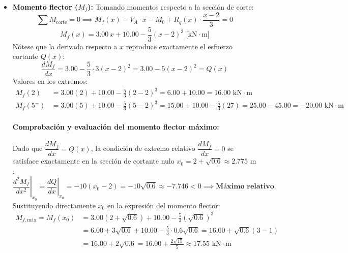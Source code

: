 \begin{itemize}
    \item \textbf{Momento flector ($M_f$):}
          Tomando momentos respecto a la sección de corte:
          \begin{equation}
              \sum M_{\text{corte}} = 0 \implies M_f(x) - V_A \cdot x - M_0 + R_q(x) \cdot \frac{x - 2}{3} = 0
          \end{equation}
          \begin{equation}
              \boxed{M_f(x) = 3.00\,x + 10.00 - \frac{5}{3}(x - 2)^3\text{ [kN}\cdot\text{m]}}
          \end{equation}
          Nótese que la derivada respecto a $x$ reproduce exactamente el esfuerzo cortante $Q(x)$:
          \begin{equation}
              \frac{dM_f}{dx} = 3.00 - \frac{5}{3} \cdot 3(x - 2)^2 = 3.00 - 5(x - 2)^2 = Q(x)
          \end{equation}
          Valores en los extremos:
          \begin{align*}
              M_f(2)   & = 3.00(2) + 10.00 - \frac{5}{3}(2 - 2)^3 = 6.00 + 10.00 = \boxed{16.00\text{ kN}\cdot\text{m}}                                     \\
              M_f(5^-) & = 3.00(5) + 10.00 - \frac{5}{3}(5 - 2)^3 = 15.00 + 10.00 - \frac{5}{3}(27) = 25.00 - 45.00 = \boxed{-20.00\text{ kN}\cdot\text{m}}
          \end{align*}

          \paragraph{Comprobación y evaluación del momento flector máximo:}
          Dado que $\dfrac{dM_f}{dx} = Q(x)$, la condición de extremo relativo $\dfrac{dM_f}{dx} = 0$ se satisface exactamente en la sección de cortante nulo $x_0 = 2 + \sqrt{0.6} \approx 2.775\text{ m}$:
          \begin{equation}
              \left.\frac{d^2 M_f}{dx^2}\right|_{x_0} = \left.\frac{dQ}{dx}\right|_{x_0} = -10(x_0 - 2) = -10\sqrt{0.6} \approx -7.746 < 0 \implies \textbf{Máximo relativo.}
          \end{equation}
          Sustituyendo directamente $x_0$ en la expresión del momento flector:
          \begin{align}
              M_{f,\text{máx}} = M_f(x_0) & = 3.00\left(2 + \sqrt{0.6}\right) + 10.00 - \frac{5}{3}\left(\sqrt{0.6}\right)^3 \nonumber          \\
                                          & = 6.00 + 3\sqrt{0.6} + 10.00 - \frac{5}{3}\cdot 0.6\sqrt{0.6} = 16.00 + \sqrt{0.6}(3 - 1) \nonumber \\
                                          & = 16.00 + 2\sqrt{0.6} = 16.00 + \frac{2\sqrt{15}}{5} \approx \boxed{17.55\text{ kN}\cdot\text{m}}
          \end{align}
\end{itemize}

